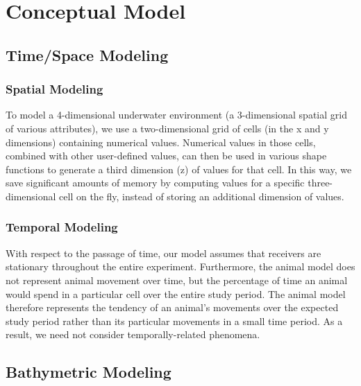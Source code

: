 \section{Conceptual Model}
\label{conceptualModel}
\subsection{Time/Space Modeling}
\label{timeSpaceModel}
\subsubsection{Spatial Modeling}
\label{spatialModeling}
To model a 4-dimensional underwater environment (a 3-dimensional spatial grid of various attributes), we use a two-dimensional grid of cells (in the x and y dimensions) containing numerical values.  Numerical values in those cells, combined with other user-defined values, can then be used in various shape functions to generate a third dimension (z) of values for that cell.  In this way, we save significant amounts of memory by computing values for a specific three-dimensional cell on the fly, instead of storing an additional dimension of values.  

\subsubsection{Temporal Modeling}
\label{temporalModeling}
With respect to the passage of time, our model assumes that receivers are stationary throughout the entire experiment.  Furthermore, the animal model does not represent animal movement over time, but the percentage of time an animal would spend in a particular cell over the entire study period.  The animal model therefore represents the tendency of an animal's movements over the expected study period rather than its particular movements in a small time period.  As a result, we need not consider temporally-related phenomena. 




\subsection{Bathymetric Modeling}
\label{bathymetyricModeling}

